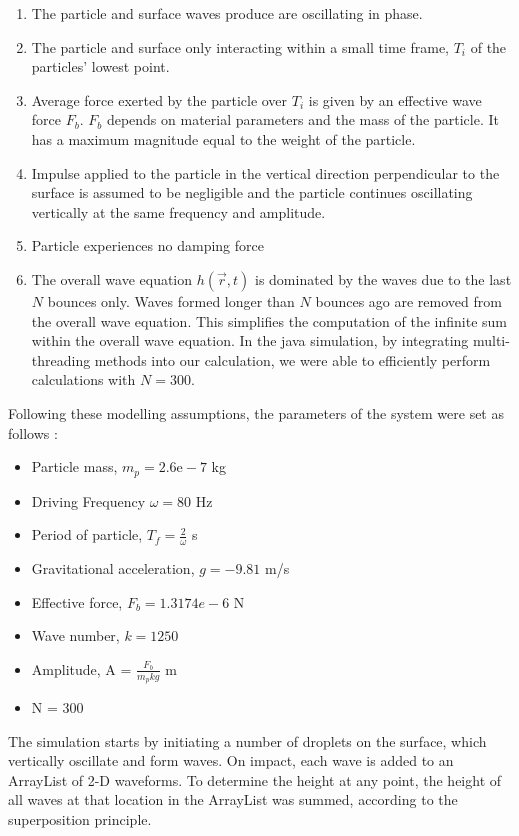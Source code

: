 \begin{enumerate}
\item The particle and surface waves produce are oscillating in phase.
\item The particle and surface only interacting within a small time frame, $T_i$ of the particles' lowest point.
\item Average force exerted by the particle over $T_i$ is given by an effective wave force $F_b$. $F_b$ depends on material parameters and the mass of the particle. It has a maximum magnitude equal to the weight of the particle.
\item Impulse applied to the particle in the vertical direction perpendicular to the surface is assumed to be negligible and the particle continues oscillating vertically at the same frequency and amplitude. 
\item Particle experiences no damping force
\item The overall wave equation $h(\vec{r} , t)$ is dominated by the waves due to the last $N$ bounces only. Waves formed longer than $N$ bounces ago are removed from the overall wave equation. This simplifies the computation of the infinite sum within the overall wave equation. In the java simulation, by integrating multi-threading methods into our calculation, we were able to efficiently perform calculations with $N = 300$.
\end{enumerate}

Following these modelling assumptions, the parameters of the system were set as follows \cite{Dotwave}:

\begin{itemize}
\item Particle mass, $m_p = 2.6\textrm{e}-7$ kg
\item Driving Frequency $\omega= 80$ Hz
\item Period of particle, $T_f = \frac{2}{\omega}$ s
\item Gravitational acceleration, $g = -9.81$ m/s
\item Effective force, $F_b = 1.3174e-6$ N
\item Wave number, $k = 1250$
\item Amplitude, A = $\frac{F_b}{m_pkg}$ m
\item N = 300
\end{itemize}

The simulation starts by initiating a number of droplets on the surface, which vertically oscillate and form waves. On impact, each wave is added to an ArrayList of 2-D waveforms. To determine the height at any point, the height of all waves at that location in the ArrayList was summed, according to the superposition principle.

